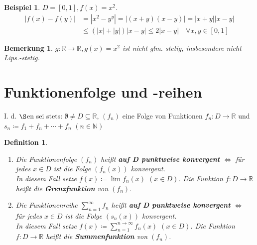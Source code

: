 \documentclass[titlepage,ngerman,a4paper,headsepline]{scrartcl}
\newcommand{\N}{\mathbb{N}}
\newcommand{\R}{\mathbb{R}}
\theoremstyle{named}
\theoremstyle{dotless}
\newtheorem*{beispiel*}{Beispiel}
\newtheorem*{bemerkung}{Bemerkung}
\newtheorem*{definition}{Definition}
\begin{document}
\begin{beispiel*}
	$D = [0, 1], f(x) = x^{2}$.
	\begin{align*}
		|f(x) - f(y) | & = |x^{2} - y^{y}| = |(x + y) (x - y)| = |x+y| |x-y| \\
			& \leq (|x| + |y|) |x - y| \leq 2 |x - y| \quad \forall x, y \in [0, 1]
	\end{align*}
\end{beispiel*}


\begin{bemerkung}
	$g \colon \R \rightarrow \R, g(x) = x^{2}$ ist nicht glm. stetig, insbesondere nicht Lips.-stetig.	
\end{bemerkung}

\newpage

\section{Funktionenfolge und -reihen}
I. d. $\S$en sei stets: $\emptyset \neq D \subseteq \R$, $(f_{n})$ eine Folge von Funktionen $f_{n} \colon D \rightarrow \R$ und $s_{n} \coloneqq f_{1} + f_{n} + \cdots + f_{n}$ $(n \in \N)$

  
\begin{definition} ~\
 	\begin{enumerate}
		\item Die Funktionenfolge $(f_{n})$ hei{\ss}t \textbf{auf D punktweise konvergent} $\iff$ für jedes $x \in D$ ist die Folge $(f_{n}(x))$ konvergent. \\
			In diesem Fall setze $f(x) \coloneqq \lim f_{n}(x)$ $(x \in D)$. Die Funktion $f \colon D \rightarrow \R$ hei{\ss}t die \textbf{Grenzfunktion} von $(f_{n})$.
		\item Die Funktionenreihe $\sum_{n=1}^{\infty} f_{n}$ hei{\ss}t  \textbf{auf D punktweise konvergent} $\iff$ für jedes $x \in D$ ist die Folge $(s_{n}(x))$ konvergent. \\
			In diesem Fall setze $f(x) \coloneqq \sum_{n=1}^{n\rightarrow\infty} f_{n}(x)$ $(x \in D)$. Die Funktion $f \colon D \rightarrow \R$ hei{\ss}t die \textbf{Summenfunktion} von $(f_{n})$.
	\end{enumerate}
\end{definition}
\end{document}
